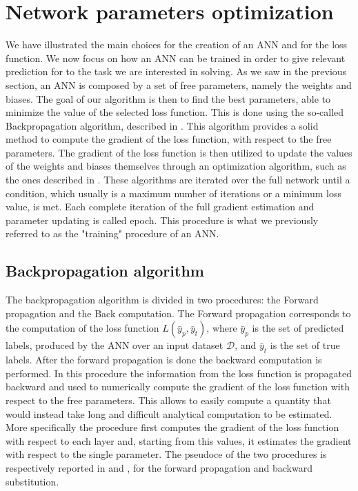 
\section{Network parameters optimization}\label{weightoptimization}

We have illustrated the main choices for the creation of an ANN and for the loss function. We now focus on how an ANN can be trained in order to give relevant prediction for to the task we are interested in solving. 
As we saw in the previous section, an ANN is composed by a set of free parameters, namely the weights and biases. The goal of our algorithm is then to find the best parameters, able to minimize the value of the selected loss function. This is done using the so-called Backpropagation algorithm\cite{backprop}, described in . This algorithm provides a solid method to compute the gradient of the loss function, with respect to the free parameters. The gradient of the loss function is then utilized to update the values of the weights and biases themselves through an optimization algorithm, such as the ones described in .
These algorithms are iterated over the full network until a condition, which usually is a maximum number of iterations or a minimum loss value, is met. Each complete iteration of the full gradient estimation and parameter updating is called epoch. This procedure is what we previously referred to as the "training" procedure of an ANN.

\subsection{Backpropagation algorithm}\label{backprop}

The backpropagation algorithm is divided in two procedures: the Forward propagation and the Back computation.
The Forward propagation corresponds to the computation of the loss function $L(\bar{y}_p, \bar{y}_t)$, where $\bar{y}_p$ is the set of predicted labels, produced by the ANN over an input dataset $\mathcal{D}$, and $\bar{y}_t$ is the set of true labels. 
After the forward propagation is done the backward computation is performed. In this procedure the information from the loss function is propagated backward and used to numerically compute the gradient of the loss function with respect to the free parameters. This allows to easily compute a quantity that would instead take long and difficult analytical computation to be estimated.
More specifically the procedure first computes the gradient of the loss function with respect to each layer and, starting from this values, it estimates the gradient with respect to the single parameter.
The pseudoce of the two procedures is respectively reported  in  and , for the forward propagation and backward substitution. 

